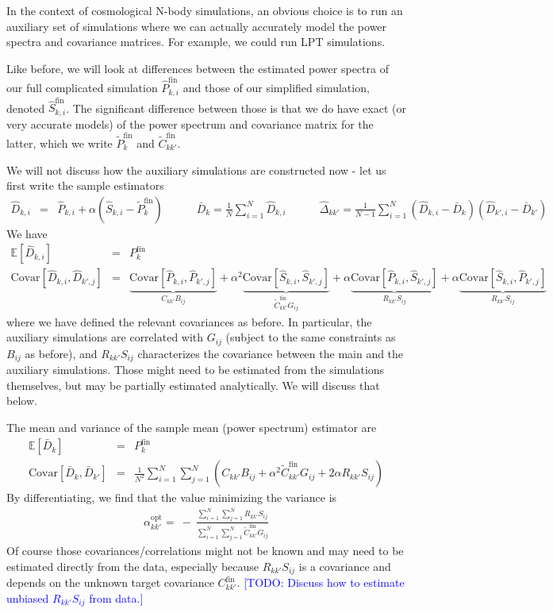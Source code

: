 \documentclass{aastex6}
\newcommand{\eqn}[1]{\begin{eqnarray}#1\end{eqnarray}}
\newcommand{\todo}[1]{\textcolor{blue}{[TODO: #1]}}
\begin{document}
In the context of cosmological N-body simulations, an obvious choice is to run an auxiliary set of simulations where we can actually accurately model the power spectra and covariance matrices. 
For example, we could run LPT simulations.

Like before, we will look at differences between the estimated power spectra of our full complicated simulation $\hat{P}^\mathrm{fin}_{k, i} $ and those of our simplified simulation, denoted $\hat{S}^\mathrm{fin}_{k, i}$. 
The significant difference between those is that  we do have exact (or very accurate models) of the power spectrum and covariance matrix for the latter, which we write $\tilde{P}^\mathrm{fin}_k$ and $\tilde{C}_{kk'}^\mathrm{fin}$.

We will not discuss how the auxiliary simulations are constructed now - let us first write the sample estimators
\eqn{
	\hat{D}_{k, i} &=&  \hat{P}_{k, i} + \alpha (\hat{S}_{k, i} - \tilde{P}^\mathrm{fin}_k)  \quad \quad\quad
	\bar{D}_k =	\frac{1}{N} \sum_{i=1}^N	\hat{D}_{k, i}	\quad \quad\quad
	\hat{\Delta}_{kk'} = \frac{1}{N-1} \sum_{i=1}^N \left( \hat{D}_{k, i} - \bar{D}_{k} \right) \left( \hat{D}_{k', i} - \bar{D}_{k'} \right)
}
We have 
\eqn{
	\mathbb{E}[\hat{D}_{k, i}] &=& {P}^\mathrm{fin}_k 	\\	
	\mathrm{Covar}[\hat{D}_{k, i}, \hat{D}_{k', j}] &=& \underbrace{\mathrm{Covar}[\hat{P}_{k, i}, \hat{P}_{k', j}]}_{C_{kk'} B_{ij}}  + \alpha^2 \underbrace{\mathrm{Covar}[\hat{S}_{k, i}, \hat{S}_{k', j}] }_{\tilde{C}_{kk'}^\mathrm{fin} G_{ij}} + \alpha \underbrace{\mathrm{Covar}[\hat{P}_{k, i}, \hat{S}_{k', j}]}_{ R_{kk'} S_{ij}} + \alpha \underbrace{\mathrm{Covar}[\hat{S}_{k, i}, \hat{P}_{k', j}]}_{ R_{kk'} S_{ij}} 
}
where we have defined the relevant covariances as before. In particular, the auxiliary simulations are correlated with $G_{ij}$ (subject to the same constraints as $B_{ij}$ as before), and $ R_{kk'} S_{ij}$ characterizes the covariance between the main and the auxiliary simulations. 
Those might need to be estimated from the simulations themselves, but may be partially estimated analytically.
We will discuss that below.

The mean and variance of the sample mean (power spectrum) estimator are
\eqn{
	\mathbb{E}[\bar{D}_{k}] &=& {P}^\mathrm{fin}_k 	\\	
	\mathrm{Covar}[\bar{D}_{k}, \bar{D}_{k'}] &=& \frac{1}{N^2}\sum_{i=1}^N\sum_{j=1}^N \left( C_{kk'} B_{ij} + \alpha^2  \tilde{C}_{kk'}^\mathrm{fin} G_{ij} + 2 \alpha  R_{kk'} S_{ij}  \right)
}
By differentiating, we find that the value minimizing the variance is
\eqn{
	{\alpha^\mathrm{opt}_{kk'}} = \ - \ \frac{ \sum_{i=1}^N\sum_{j=1}^N  R_{kk'} S_{ij} }{ \sum_{i=1}^N\sum_{j=1}^N \tilde{C}_{kk'}^\mathrm{fin} G_{ij} }
}
Of course those covariances/correlations might not be known and may need to be estimated directly from the data, especially because $R_{kk'} S_{ij}$ is a covariance and depends on the unknown target	 covariance ${C}_{kk'}^\mathrm{fin}$.
\todo{Discuss how to estimate unbiased $ R_{kk'} S_{ij}$ from data.}
\end{document}
